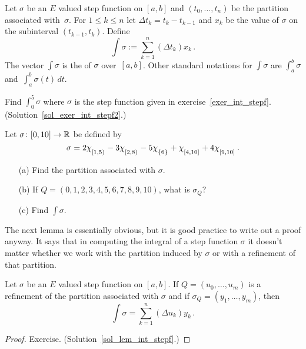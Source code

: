 \begin{defn}  Let $\sigma$ be an $E$ valued step function on $[a,b]$ and $(t_0, \dots, t_n)$
be the partition associated with~$\sigma$.  For $1 \le k \le n$ let $\Delta t_k = t_k -
t_{k- 1}$ and $x_k$ be the value of $\sigma$ on the subinterval $(t_{k-1},t_k)$.  Define
 \[ \int \sigma := \sum_{k=1}^n (\Delta t_k) x_k\,. \]
The vector $\int\sigma$ is the
 of $\sigma$ over~$[a,b]$.  Other standard notations for $\int\sigma$ are
$\int_a^b \sigma$ and~$\int_a^b \sigma(t)\,dt$.
\end{defn}

\begin{exer}\label{exer_int_stepf2} Find $\int_0^5 \sigma$ where $\sigma$ is the step function
given in exercise~\ref{exer_int_stepf}.  (Solution~\ref{sol_exer_int_stepf2}.)
\end{exer}

\begin{prob}  Let $\sigma\colon [0,10] \rightarrow \mathbb{R}$  be defined by
  \[ \sigma =  2\chi_{{}_{\scriptstyle{[1,5)}}}
              -3\chi_{{}_{\scriptstyle{[2,8)}}}
              -5\chi_{{}_{\scriptstyle{\{6\}}}}
              + \chi_{{}_{\scriptstyle{[4,10]}}}
             +4 \chi_{{}_{\scriptstyle{[9,10]}}}\,. \]
 \begin{enumerate}
  \item[(a)] Find the partition associated with $\sigma$.
  \item[(b)] If $Q = (0,1,2,3,4,5,6,7,8,9,10)$, what is $\sigma_Q$?
  \item[(c)] Find $\int \sigma$.
 \end{enumerate}
\end{prob}

The next lemma is essentially obvious, but it is good practice to write out a proof anyway.
It says that in computing the integral of a step function $\sigma$ it doesn't matter whether
we work with the partition induced by $\sigma$ or with a refinement of that partition.

\begin{lem}\label{lem_int_stepf}  Let $\sigma$ be an $E$ valued step function on $[a,b]$.
If $Q = (u_0, \dots, u_m)$ is a refinement of the partition associated with $\sigma$ and if
$\sigma_Q = (y_1, \dots, y_m)$, then
  \[ \int\sigma = \sum_{k=1}^n(\Delta u_k)y_k\,. \]
\end{lem}

\begin{proof} Exercise.  (Solution~\ref{sol_lem_int_stepf}.)  \ns  \end{proof}

